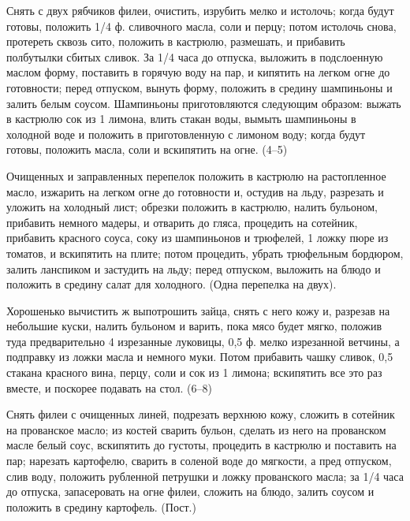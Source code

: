Снять с двух рябчиков филеи, очистить, изрубить мелко и истолочь; когда будут готовы, положить 1/4 ф. сливочного масла, соли и перцу; потом истолочь снова, протереть сквозь сито, положить в кастрюлю, размешать, и прибавить полбутылки сбитых сливок. За 1/4 часа до отпуска, выложить в подслоенную маслом форму, поставить в горячую воду на пар, и кипятить на легком огне до готовности; перед отпуском, вынуть форму, положить в средину шампиньоны и залить белым соусом. Шампиньоны приготовляются следующим образом: выжать в кастрюлю сок из 1 лимона, влить стакан воды, вымыть шампиньоны в холодной воде и положить в приготовленную с лимоном воду; когда будут готовы, положить масла, соли и вскипятить на огне. (4--5) 


Очищенных и заправленных перепелок положить в кастрюлю на растопленное масло, изжарить на легком огне до готовности и, остудив на льду, разрезать и уложить на холодный лист; обрезки положить в кастрюлю, налить бульоном, прибавить немного мадеры, и отварить до гляса, процедить на сотейник, прибавить красного соуса, соку из шампиньонов и трюфелей, 1 ложку пюре из томатов, и вскипятить на плите; потом процедить, убрать трюфельным бордюром, залить ланспиком и застудить на льду; перед отпуском, выложить на блюдо и положить в средину салат для холодного. (Одна перепелка на двух). 


Хорошенько вычистить ж выпотрошить зайца, снять с него кожу и, разрезав на небольшие куски, налить бульоном и варить, пока мясо будет мягко, положив туда предварительно 4 изрезанные луковицы, 0,5 ф. мелко изрезанной ветчины, а подправку из ложки масла и немного муки. Потом прибавить чашку сливок, 0,5 стакана красного вина, перцу, соли и сок из 1 лимона; вскипятить все это раз вместе, и поскорее подавать на стол. (6--8) 


Снять филеи с очищенных линей, подрезать верхнюю кожу, сложить в сотейник на прованское масло; из костей сварить бульон, сделать из него на прованском масле белый соус, вскипятить до густоты, процедить в кастрюлю и поставить на пар; нарезать картофелю, сварить в соленой воде до мягкости, а пред отпуском, слив воду, положить рубленной петрушки и ложку прованского масла; за 1/4 часа до отпуска, запасеровать на огне филеи, сложить на блюдо, залить соусом и положить в средину картофель. (Пост.) 

